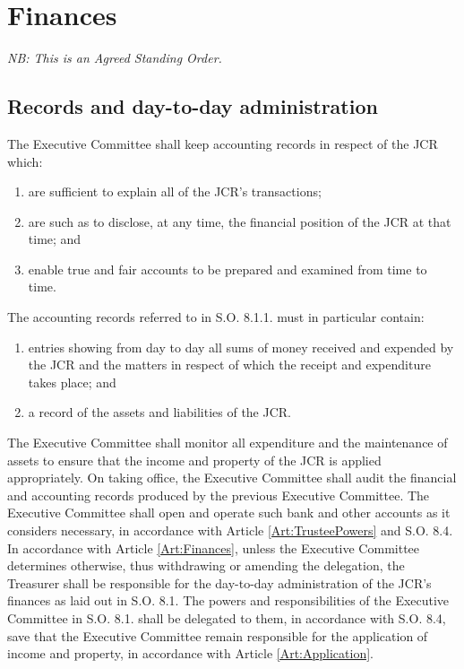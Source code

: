 \chapter{Finances}
\textit{NB: This is an Agreed Standing Order.}
\section{Records and day-to-day administration}
\npara The Executive Committee shall keep accounting records in respect of the JCR which:
\begin{enumerate}
\item are sufficient to explain all of the JCR's transactions;
\item are such as to disclose, at any time, the financial position of the JCR at that time; and
\item enable true and fair accounts to be prepared and examined from time to time.
\end{enumerate}
\npara The accounting records referred to in S.O. 8.1.1. must in particular contain:
\begin{enumerate}
\item entries showing from day to day all sums of money received and expended by the JCR and the matters in respect of which the receipt and expenditure takes place; and
\item a record of the assets and liabilities of the JCR.
\end{enumerate}
\npara The Executive Committee shall monitor all expenditure and the maintenance of assets to ensure that the income and property of the JCR is applied appropriately.
\npara On taking office, the Executive Committee shall audit the financial and accounting records produced by the previous Executive Committee.
\npara The Executive Committee shall open and operate such bank and other accounts as it considers  necessary, in accordance with Article \ref{Art:TrusteePowers} and S.O. 8.4.
\npara In accordance with Article \ref{Art:Finances}, unless the Executive Committee determines otherwise, thus withdrawing or amending the delegation, the Treasurer shall be responsible for the day-to-day administration of the JCR's finances as laid out in S.O. 8.1.  The powers and responsibilities of the Executive Committee in S.O. 8.1. shall be delegated to them, in accordance with S.O. 8.4, save that the Executive Committee remain responsible for the application of income and property, in accordance with Article \ref{Art:Application}.
